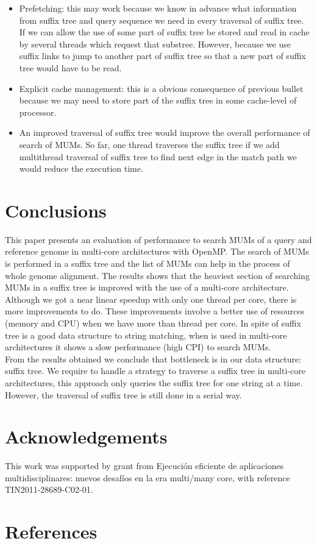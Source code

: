 \documentclass[3p,times]{elsarticle}
\begin{document}
\begin{itemize}
  \item Prefetching: this may work because we know in advance what information from suffix tree and query sequence we need in every traversal of suffix tree. If we can allow the use of some part of suffix tree be stored and read in cache by several threads which request that substree. However, because we use suffix links to jump to another part of suffix tree so that a new part of suffix tree would have to be read.
  \item Explicit cache management: this is a obvious consequence of previous bullet because we may need to store part of the suffix tree in some cache-level of processor.
  \item An improved traversal of suffix tree would improve the overall performance of search of MUMs. So far, one thread traverses the suffix tree if we add multithread traversal of suffix tree to find next edge in the match path we would reduce the execution time.
\end{itemize}

\section{Conclusions}
This paper presents an evaluation of performance to search MUMs of a query and reference genome in multi-core architectures with OpenMP. The search of MUMs is performed in a suffix tree and the list of MUMs can help in the process of whole genome alignment. The results shows that the heaviest section of searching MUMs in a suffix tree is improved with the use of a multi-core architecture. Although we got a near linear speedup with only one thread per core, there is more improvements to do. These improvements involve a better use of resources (memory and CPU) when we have more than thread per core. In spite of suffix tree is a good data structure to string matching, when is used in multi-core architectures it shows a slow performance (high CPI) to search MUMs.\\
From the results obtained we conclude that bottleneck is in our data structure: suffix tree. We require to handle a strategy to traverse a suffix tree in multi-core architectures, this approach only queries the suffix tree for one string at a time. However, the traversal of suffix tree is still done in a serial way.

\section*{Acknowledgements}
This work was supported by grant from Ejecuci\'on eficiente de aplicaciones multidisciplinares: nuevos desaf\'ios en la era multi/many core, with reference TIN2011-28689-C02-01.

\section*{References}


\end{document}
